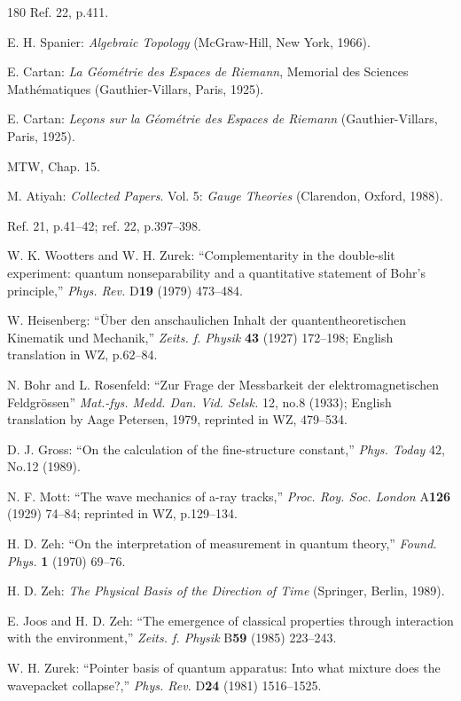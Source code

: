 \documentclass[11pt]{article}
\begin{document}
\begin{thebibliography}{180}
		Ref. 22, p.411.
		
		E. H. Spanier: \emph{Algebraic Topology} (McGraw-Hill, New York, 1966).
		
		E. Cartan: \emph{La Géométrie des Espaces de Riemann}, Memorial des Sciences Mathématiques (Gauthier-Villars, Paris, 1925).
		
		E. Cartan: \emph{Leçons sur la Géométrie des Espaces de Riemann} (Gauthier-Villars, Paris, 1925).
		
		MTW, Chap. 15.
		
		M. Atiyah: \emph{Collected Papers}. Vol. 5: \emph{Gauge Theories} (Clarendon, Oxford, 1988).
		
		Ref. 21, p.41--42; ref. 22, p.397--398.
		
		W. K. Wootters and W. H. Zurek: ``Complementarity in the double-slit experiment: quantum nonseparability and a quantitative statement of Bohr's principle,'' \emph{Phys. Rev.} D\textbf{19} (1979) 473--484.
		
		W. Heisenberg: ``Über den anschaulichen Inhalt der quantentheoretischen Kinematik und Mechanik,'' \emph{Zeits. f. Physik} \textbf{43} (1927) 172--198; English translation in WZ, p.62--84.
		
		N. Bohr and L. Rosenfeld: ``Zur Frage der Messbarkeit der elektromagnetischen Feldgrössen'' \emph{Mat.-fys. Medd. Dan. Vid. Selsk.} 12, no.8 (1933); English translation by Aage Petersen, 1979, reprinted in WZ, 479--534.
		
		D. J. Gross: ``On the calculation of the fine-structure constant,'' \emph{Phys. Today} 42, No.12 (1989).
		
		N. F. Mott: ``The wave mechanics of a-ray tracks,'' \emph{Proc. Roy. Soc. London} A\textbf{126} (1929) 74--84; reprinted in WZ, p.129--134.
		
		H. D. Zeh: ``On the interpretation of measurement in quantum theory,'' \emph{Found. Phys.} \textbf{1} (1970) 69--76.
		
		H. D. Zeh: \emph{The Physical Basis of the Direction of Time} (Springer, Berlin, 1989).
		
		E. Joos and H. D. Zeh: ``The emergence of classical properties through interaction with the environment,'' \emph{Zeits. f. Physik} B\textbf{59} (1985) 223--243.
		
		W. H. Zurek: ``Pointer basis of quantum apparatus: Into what mixture does the wavepacket collapse?,'' \emph{Phys. Rev.} D\textbf{24} (1981) 1516--1525.
		

\end{thebibliography}
\end{document}
